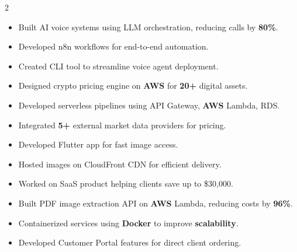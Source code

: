 \documentclass[10pt,a4paper]{altacv}
\begin{document}

\begin{fullwidth}
\makecvheader
\end{fullwidth}

\begin{paracol}{2}


\begin{itemize}
\item Built AI voice systems using LLM orchestration, reducing calls by \textbf{80\%}.
\item Developed n8n workflows for end-to-end automation.
\item Created CLI tool to streamline voice agent deployment.
\end{itemize}
\divider

\begin{itemize}
\item Designed crypto pricing engine on \textbf{AWS} for \textbf{20+} digital assets.
\item Developed serverless pipelines using API Gateway, \textbf{AWS} Lambda, RDS.
\item Integrated \textbf{5+} external market data providers for pricing.
\end{itemize}
\divider

\begin{itemize}
\item Developed Flutter app for fast image access.
\item Hosted images on CloudFront CDN for efficient delivery.
\item Worked on SaaS product helping clients save up to \$30,000.
\end{itemize}
\divider

\begin{itemize}
\item Built PDF image extraction API on \textbf{AWS} Lambda, reducing costs by \textbf{96\%}.
\item Containerized services using \textbf{Docker} to improve \textbf{scalability}.
\item Developed Customer Portal features for direct client ordering.
\end{itemize}


\end{paracol}
\end{document}
